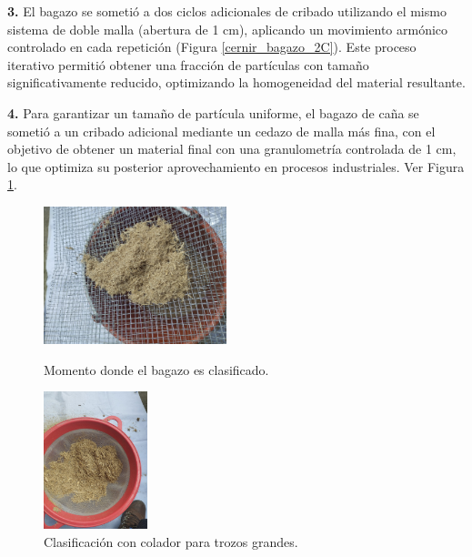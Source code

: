 \documentclass[12pt]{article}
\begin{document}
			
			
			
			
			\textbf{3.}	El bagazo se sometió a dos ciclos adicionales de cribado utilizando el mismo sistema de doble malla (abertura de 1 cm), aplicando un movimiento armónico controlado en cada repetición (Figura \ref{cernir_bagazo_2C}). Este proceso iterativo permitió obtener una fracción de partículas con tamaño significativamente reducido, optimizando la homogeneidad del material resultante.
			
			
			\textbf{4.} Para garantizar un tamaño de partícula uniforme, el bagazo de caña se sometió a un cribado adicional mediante un cedazo de malla más fina, con el objetivo de obtener un material final con una granulometría controlada de 1 cm, lo que optimiza su posterior aprovechamiento en procesos industriales. Ver Figura \ref{cernir_bagazo_cedazo}.
		
		
			\begin{figure}[H]
			\centering
			\begin{minipage}{0.46\textwidth}
				\centering
			\includegraphics[width=\linewidth, height=4cm, keepaspectratio]{imagenes/cernir_bagazo_2}
			\caption{Momento donde el bagazo es clasificado.}
			\label{cernir_bagazo_2C}
			\end{minipage}
			\hfill
			\begin{minipage}{0.48\textwidth}
				\centering
				\includegraphics[width=\linewidth, height=4cm, keepaspectratio]{imagenes/cernir_bagazo_cedazo}
				\caption{Clasificación con colador para trozos grandes.}
				\label{cernir_bagazo_cedazo}
			\end{minipage}
		\end{figure}
		
\end{document}
